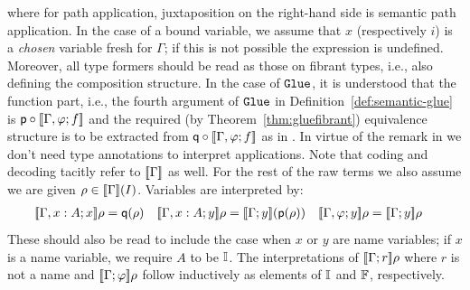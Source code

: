 \endgroup
where for path application, juxtaposition on the right-hand side is
semantic path application.  In the case of a bound variable, we assume
that $x$ (respectively $i$) is a \emph{chosen} variable fresh for
$\Gamma$; if this is not possible the expression is undefined.
Moreover, all type formers should be read as those on fibrant types,
i.e., also defining the composition structure.  In the case of
$\operatorname{\mathtt{Glue}}$, it is understood that the function part, i.e., the fourth
argument of $\operatorname{\mathtt{Glue}}$ in Definition~\ref{def:semantic-glue} is ${\sf p}
\circ [\![\Gamma,\varphi;f{}]\!]$ and the required (by
Theorem~\ref{thm:gluefibrant}) equivalence structure is to be
extracted from ${\sf q} \circ [\![\Gamma,\varphi;f{}]\!]$ as in
.  In virtue of the remark in
 we don't need type annotations to
interpret applications.  Note that coding and decoding tacitly refer
to $[\![\Gamma]\!]$ as well.  For the rest of the raw terms we also
assume we are given $\rho \in [\![\Gamma]\!](I)$.  Variables are
interpreted by:
\begin{align*}
  \den{\Gamma, x :A; x} \rho &= \qq (\rho) %
  & %
  \den{\Gamma, x :A; y} \rho &= \den {\Gamma; y} (\pp (\rho))%
  & %
  \den{\Gamma, \varphi; y} \rho &= \den{\Gamma;y} \rho %
\end{align*}
These should also be read to include the case when $x$ or $y$ are name
variables; if $x$ is a name variable, we require $A$ to be $\mathbb{I}$.  The
interpretations of $[\![\Gamma;r]\!] \rho$ where $r$ is not a name and
$[\![\Gamma;\varphi]\!] \rho$ follow inductively as elements of $\mathbb{I}$
and $\mathbb{F}$, respectively.


